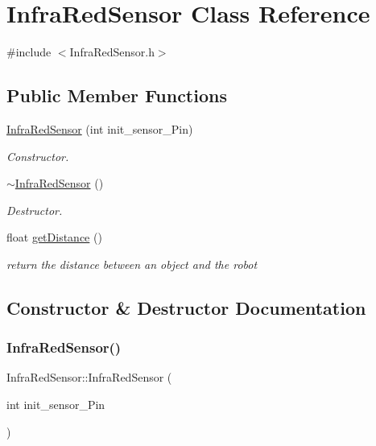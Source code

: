 \hypertarget{class_infra_red_sensor}{}\section{Infra\+Red\+Sensor Class Reference}
\label{class_infra_red_sensor}


{\ttfamily \#include $<$Infra\+Red\+Sensor.\+h$>$}

\subsection*{Public Member Functions}
\begin{DoxyCompactItemize}
\item 
\hyperlink{class_infra_red_sensor_aa2974c364e9397074acc70acb848973c}{Infra\+Red\+Sensor} (int init\+\_\+sensor\+\_\+\+Pin)
\begin{DoxyCompactList}\small\item\em Constructor. \end{DoxyCompactList}\item 
\hyperlink{class_infra_red_sensor_a0444b90b3740fe361388907ee7f9930f}{$\sim$\+Infra\+Red\+Sensor} ()
\begin{DoxyCompactList}\small\item\em Destructor. \end{DoxyCompactList}\item 
float \hyperlink{class_infra_red_sensor_a60ca6c269209278cac5da50e5a4fbc0a}{get\+Distance} ()
\begin{DoxyCompactList}\small\item\em return the distance between an object and the robot \end{DoxyCompactList}\end{DoxyCompactItemize}


\subsection{Constructor \& Destructor Documentation}
\mbox{\label{class_infra_red_sensor_aa2974c364e9397074acc70acb848973c}} 
\subsubsection{\texorpdfstring{Infra\+Red\+Sensor()}{InfraRedSensor()}}
{\footnotesize\ttfamily Infra\+Red\+Sensor\+::\+Infra\+Red\+Sensor (\begin{DoxyParamCaption}\item[{int}]{init\+\_\+sensor\+\_\+\+Pin }\end{DoxyParamCaption})}



